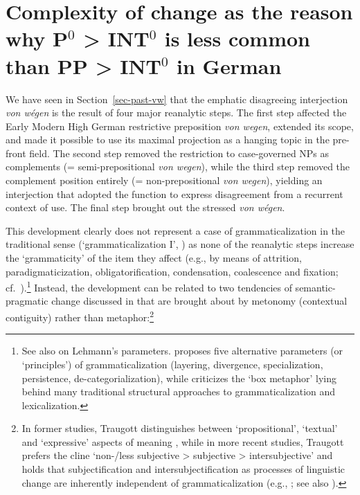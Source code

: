 \documentclass[output=paper
  ,nobabel
  ,draftmode
  ,babelshorthands
  ,colorlinks, citecolor=brown
]{langscibook}
\begin{document}
\section{Complexity of change as the reason why P$^0$ > INT$^0$ is less common than PP > INT$^0$ in German}\label{sec-complex-vw}

We have seen in Section~\ref{sec-past-vw} that the emphatic disagreeing interjection \emph{von wégen} is the result of four major reanalytic steps. The first step affected the Early Modern High German restrictive preposition \emph{von wegen}, extended its scope, and made it possible to use its maximal projection as a hanging topic in the pre-front field. The second step removed the restriction to case-governed NPs as complements (= semi-prepositional \emph{von wegen}), while the third step removed the complement position entirely (= non-prepositional \emph{von wegen}), yielding an interjection that adopted the function to express disagreement from a recurrent context of use. The final step brought out the stressed \emph{von wégen}.

This development clearly does not represent a case of grammaticalization in the traditional sense (`grammaticalization I', \citealp{Wischer2000})
as none of the reanalytic steps increase the `grammaticity' of the item they affect (e.g., by means of attrition, paradigmaticization, obligatorification, condensation, coalescence and fixation; cf.\ \citealp[174]{Lehmann2015}).\footnote{See also \citet{Norde2012} on Lehmann’s parameters. \citet{Hopper1991,Hopper1996}
proposes five alternative parameters (or `principles') of grammaticalization (layering, divergence, specialization, persistence, de-categorialization), while \citet{Himmelmann2004}
criticizes the `box metaphor' lying behind many traditional structural approaches to
grammaticalization and lexicalization.}  Instead, the development can be related to two tendencies
of semantic\hyp pragmatic change discussed in \citet{TraugottKoenig1991} that are brought about by metonomy (contextual contiguity) rather than metaphor:\footnote{In former studies, Traugott distinguishes between `propositional', `textual' and `expressive' aspects of meaning \citep[cf.][]{Traugott1982}, while in more recent studies, Traugott prefers the cline `non-/less subjective > subjective > intersubjective' and holds that subjectification and intersubjectification as processes of linguistic change are inherently independent of grammaticalization (e.g., \citealp{Traugott2010}; see also \citealp[57–59]{Brinton1996}).
}
 
\end{document}
